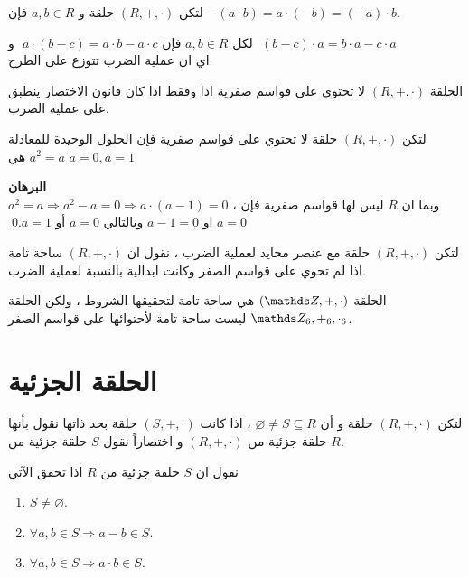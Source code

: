  \begin{theorem}
 	لتكن $(R, +, \cdot)$ حلقة و $a,b\in R$ فإن 
 	$-(a\cdot b) = a\cdot (-b) = (-a)\cdot b$.
 \end{theorem}
 
 \begin{corollary}
 	لكل $a,b\in R$ فإن
 	$a\cdot (b-c) = a\cdot b - a\cdot c$\,\,  و \,\,$(b-c) \cdot a = b\cdot a - c\cdot a$\\
 	اي ان عملية الضرب تتوزع على الطرح.
 \end{corollary}
 
 \begin{theorem}
 	الحلقة $(R, +, \cdot)$ لا تحتوي على قواسم صفرية اذا وفقط اذا كان قانون الاختصار ينطبق على عملية الضرب.
 \end{theorem}
 
 \begin{corollary}
 	لتكن $(R, +, \cdot)$ حلقة لا تحتوي على قواسم صفرية فإن الحلول الوحيدة للمعادلة $a^2=a$ هي  $a=0, a=1$ 
 \end{corollary}
 \noindent
 \textbf{البرهان}\\
 \noindent
 $a^2 =a\Rightarrow a^2-a=0\Rightarrow a\cdot(a-1)=0 $ ، وبما ان $R$ ليس لها قواسم صفرية فإن $a=0$ او $a-1=0$ وبالتالي $a=0 $ أو $a=1$.\qed
 
 \begin{definition}
 	لتكن $(R, +, \cdot)$ حلقة مع عنصر محايد لعملية الضرب ، نقول ان $(R, +, \cdot)$ ساحة تامة اذا لم تحوي على قواسم الصفر وكانت ابدالية بالنسبة لعملية الضرب.
 \end{definition}
 
 \begin{example}
 	الحلقة $(\Z, +, \cdot)$ هي ساحة تامة لتحقيقها الشروط ، ولكن الحلقة 
 	$\Z_6, +_6, \cdot_6$ ليست ساحة تامة لأحتوائها على قواسم الصفر.
 \end{example}
 \newpage
 \section{الحلقة الجزئية}
 
 \begin{definition}
 	لتكن $(R, +, \cdot)$ حلقة و أن $\varnothing\neq S\subseteq R$ ، اذا كانت $(S, +, \cdot)$ حلقة بحد ذاتها نقول بأنها حلقة جزئية من $(R, +, \cdot)$ و اختصاراً نقول $S$ حلقة جزئية من $R$.
 \end{definition}
 
 \begin{note}
 	نقول ان $S$ حلقة جزئية من $R$ اذا تحقق الآتي
 	\begin{enumerate}[label=$\boxed{\arabic*}$]
 		\item $S\neq \varnothing$.
 		\item $\forall a,b\in S \Rightarrow a-b\in S$.
 		\item $\forall a,b\in S\Rightarrow a\cdot b\in S$.
 	\end{enumerate}
 \end{note}
 
